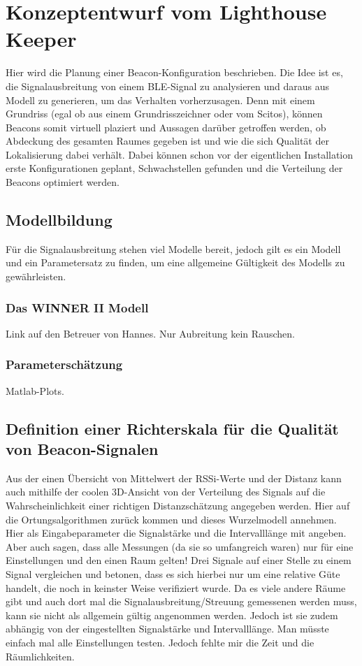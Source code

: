 \chapter{Konzeptentwurf vom Lighthouse Keeper}
Hier wird die Planung einer Beacon-Konfiguration beschrieben. Die Idee ist es, die Signalausbreitung von einem BLE-Signal zu analysieren und daraus aus Modell zu generieren, um das Verhalten vorherzusagen. Denn mit einem Grundriss (egal ob aus einem Grundrisszeichner oder vom Scitos), können Beacons somit virtuell plaziert und Aussagen darüber getroffen werden, ob Abdeckung des gesamten Raumes gegeben ist und wie die sich Qualität der Lokalisierung dabei verhält. Dabei können schon vor der eigentlichen Installation erste Konfigurationen geplant, Schwachstellen gefunden und die Verteilung der Beacons optimiert werden. 
\section{Modellbildung}
Für die Signalausbreitung stehen viel Modelle bereit, jedoch gilt es ein Modell und ein Parametersatz zu finden, um eine allgemeine Gültigkeit des Modells zu gewährleisten. 
\subsection{Das WINNER II Modell}
Link auf den Betreuer von Hannes. Nur Aubreitung kein Rauschen.
\subsection{Parameterschätzung}
Matlab-Plots.

\section{Definition einer Richterskala für die Qualität von Beacon-Signalen}
Aus der einen Übersicht von Mittelwert der RSSi-Werte und der Distanz kann auch mithilfe der coolen 3D-Ansicht von der Verteilung des Signals auf die Wahrscheinlichkeit einer richtigen Distanzschätzung angegeben werden. Hier auf die Ortungsalgorithmen zurück kommen und dieses Wurzelmodell annehmen. Hier als Eingabeparameter die Signalstärke und die Intervalllänge mit angeben. Aber auch sagen, dass alle Messungen (da sie so umfangreich waren) nur für eine Einstellungen und den einen Raum gelten! Drei Signale auf einer Stelle zu einem Signal vergleichen und betonen, dass es sich hierbei nur um eine relative Güte handelt, die noch in keinster Weise verifiziert wurde. Da es viele andere Räume gibt und auch dort mal die Signalausbreitung/Streuung gemessenen werden muss, kann sie nicht als allgemein gültig angenommen werden. Jedoch ist sie zudem abhängig von der eingestellten Signalstärke und Intervalllänge. Man müsste einfach mal alle Einstellungen testen. Jedoch fehlte mir die Zeit und die Räumlichkeiten.  

